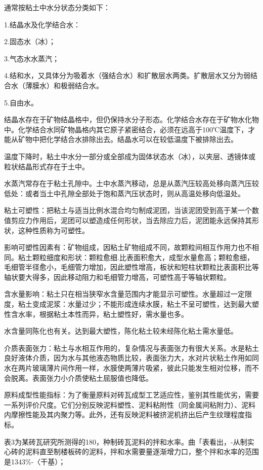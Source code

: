 \documentclass{ctexbook}
\begin{document}
通常按粘土中水分状态分类如下：

1.结晶水及化学结合水：

2.固态水（冰）；

3.气态水水蒸汽；

4.结和水，又具体分为吸着水（强结合水）和扩散层水两类。扩散层水又分为弱结合水（薄膜水）和极弱结合水。

5.自由水。

结晶水存在于矿物结晶格中，但仍保持水分子形态。化学结合水存在于矿物水化物中。化学结合水同矿物晶格内其它原子紧密结合，必须在远高于100℃温度下，才能从矿物中把化学结合水排除出去。结晶水可以在较低温度下被排除出去。

温度下降时，粘土中水分一部分或全部成为固体状态水（冰），以夹层、透镜体或粒状结晶形式存在于土中。

水蒸汽常存在于粘土孔隙中。土中水蒸汽移动，总是从蒸汽压较高处移向蒸汽压较低处：或者当土中孔隙全部处于饱和蒸汽压状态时，则从高温处移向低温处。

粘土可塑性：把粘土与适当比例水混合均匀制成泥团，当该泥团受到高于某一个数值剪应力作用后，泥团可以塑造成任何形状，当去除应力后，泥团能永远保持其形状，这种性质称为可塑性。

影响可塑性因素有：矿物组成，因粘土矿物组成不同，故颗粒间相互作用力也不相同。粘土颗粒细度和形状：颗粒愈细.比表面积愈大，成型水量愈高；颗粒愈细，毛细管半径愈小，毛细管力增加，因此塑性增高，板状和短柱状颗粒比表面积比等轴状要大得多，因此移动阻力和毛细管力增高，可塑性高于等轴状颗粒。

含水量影响：粘土只在相当狭窄水含量范围内才能显示可塑性。水量超过一定限度，粘土变成泥浆：水量过少；不能形成连续水膜，粘土不呈可塑性，达到最大塑性含水率，根据粘土本性而异，粘土塑性好，需水量也多。

水含量同陈化也有关。达到最大塑性，陈化粘土较未经陈化粘土需水量低。

介质表面张力：粘土与水相互作用的，复杂情况与表面张力有很大关系。水是粘土良好液体介质，因为水与其他液态物质比较，表面张力大，水对片状粘土作用如同水在两片玻璃薄片间作用一样，水膜使两薄片吸紧，彼此只能发生相对位移，而不会脱离。表面张力小介质使粘土屈服值也降低。

原料成型性能指标：为了衡量原料对砖瓦成型工艺适应性，鉴别其性能优劣，需要一系列评价尺度。它们分别反映泥料塑性、泥料粘附性（同金属间粘附力）、泥料内摩擦性能及其内聚力等。此外，还有反映泥料被挤泥机挤出后产生纹理程度指标。

表3为某砖瓦研究所测得的180，种制砖瓦泥料的拌和水率。曲「表看出，-从制实心砖的泥料直至制楼板砖的泥料，拌和水需要量逐渐增力口，整个拌和水率的范围是1343\%-〈干基）；
\end{document}
